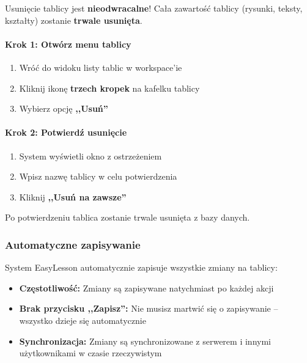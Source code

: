 \documentclass[12pt,a4paper]{article}
\begin{document}
\begin{tcolorbox}[colback=red!10!white,colframe=red!75!black,title=\faExclamationTriangle\ OSTRZEŻENIE]
Usunięcie tablicy jest \textbf{nieodwracalne}! Cała zawartość tablicy (rysunki, teksty, kształty) zostanie \textbf{trwale usunięta}.
\end{tcolorbox}

\paragraph{Krok 1: Otwórz menu tablicy}

\begin{enumerate}
    \item Wróć do widoku listy tablic w workspace'ie
    \item Kliknij ikonę \textbf{trzech kropek} na kafelku tablicy
    \item Wybierz opcję \textbf{,,Usuń''}
\end{enumerate}

\paragraph{Krok 2: Potwierdź usunięcie}

\begin{enumerate}
    \item System wyświetli okno z ostrzeżeniem
    \item Wpisz nazwę tablicy w celu potwierdzenia
    \item Kliknij \textbf{,,Usuń na zawsze''}
\end{enumerate}

Po potwierdzeniu tablica zostanie trwale usunięta z bazy danych.

\subsubsection{Automatyczne zapisywanie}

System EasyLesson automatycznie zapisuje wszystkie zmiany na tablicy:

\begin{itemize}
    \item \textbf{Częstotliwość:} Zmiany są zapisywane natychmiast po każdej akcji
    \item \textbf{Brak przycisku ,,Zapisz'':} Nie musisz martwić się o zapisywanie -- wszystko dzieje się automatycznie
    \item \textbf{Synchronizacja:} Zmiany są synchronizowane z serwerem i innymi użytkownikami w czasie rzeczywistym
\end{itemize}
\end{document}
